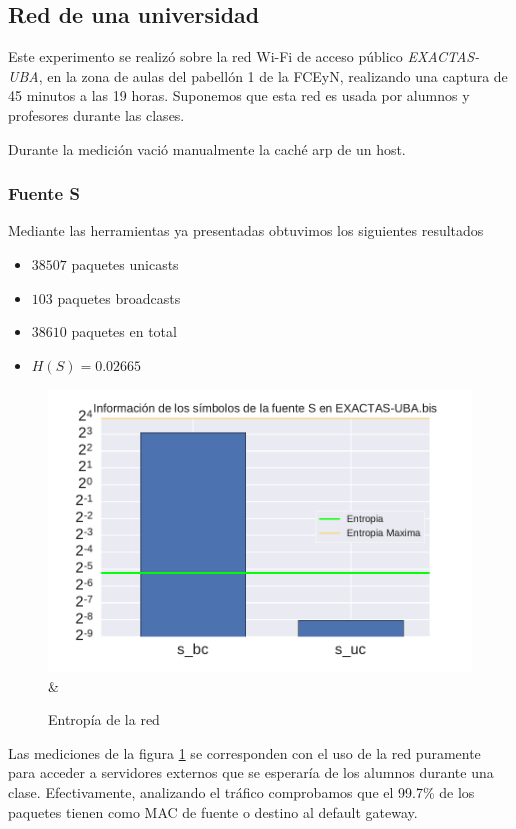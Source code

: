 
\subsection{Red de una universidad}
Este experimento se realizó sobre la red Wi-Fi de acceso público \textit{EXACTAS-UBA}, en la zona de aulas del pabellón 1 de la FCEyN, realizando una captura de 45 minutos a las 19 horas.
Suponemos que esta red es usada por alumnos y profesores durante las clases.

Durante la medición vació manualmente la caché arp de un host.

\subsubsection{Fuente S}

Mediante las herramientas ya presentadas obtuvimos los siguientes resultados
\begin{itemize}
 \item $38507$ paquetes unicasts
 \item $103$ paquetes broadcasts
 \item $38610$ paquetes en total
 \item $H(S) = 0.02665$
\end{itemize}

\begin{figure}[H]
   \centering
       \includegraphics[page=1,width=.70\textwidth]{../img/barras-EXACTAS-UBA-bis} &
 \caption{Entropía de la red}
 \label{fig:barras-exactas}
\end{figure}

Las mediciones de la figura \ref{fig:barras-exactas} se corresponden con el uso de la red puramente para acceder a servidores externos que se esperaría de los alumnos durante una clase.
Efectivamente, analizando el tráfico comprobamos que el 99.7\% de los paquetes tienen como MAC de fuente o destino al default gateway.

